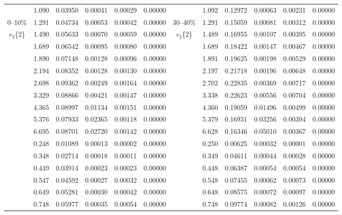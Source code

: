 \documentclass[aps,prc,superscriptaddress,showpacs,floatfix,twocolumn]{revtex4}
\begin{document}
\begin{table}[htbp]
\begin{ruledtabular}
\begin{tabular}{c|ccccc||c|ccccc}
 & 1.090 & 0.03950 & 0.00041 & 0.00029   &  0.00000 &  & 1.092 & 0.12972   & 0.00063 &  0.00231  & 0.00000 \\
0--10\% 
 & 1.291 & 0.04734 &  0.00053 & 0.00042  & 0.00000 &  30--40\%& 1.291 & 0.15059   & 0.00081 &  0.00312 & 0.00000 \\
$v_2$\{2\}  
& 1.490 &    0.05633   &  0.00070   & 0.00059 & 0.00000 &  $v_2$\{2\} & 1.489 & 0.16955   & 0.00107 &  0.00395 & 0.00000 \\
 & 1.689 &   0.06542   &  0.00095   & 0.00080  & 0.00000 &  	      & 1.689 & 0.18422   & 0.00147 &  0.00467 & 0.00000 \\
 & 1.890 &   0.07148   &  0.00128   & 0.00096  & 0.00000 &            & 1.891 & 0.19625   & 0.00198 &  0.00529 & 0.00000 \\
 & 2.194 &   0.08352   &  0.00128   & 0.00130  & 0.00000 &            & 2.197 & 0.21718   & 0.00196 &  0.00648 & 0.00000 \\
 & 2.698 &   0.09362   &  0.00249   & 0.00164  & 0.00000 &            & 2.702 & 0.22835   & 0.00369 &  0.00717 & 0.00000 \\
 & 3.329 &   0.08866   &  0.00421   & 0.00147  & 0.00000 &            & 3.338 & 0.22623   & 0.00556 &  0.00704 & 0.00000 \\
 & 4.365 &   0.08997   &  0.01134   & 0.00151  & 0.00000 &            & 4.360 & 0.19059   & 0.01496 &  0.00499 & 0.00000 \\
 & 5.376 &   0.07933   &  0.02365   & 0.00118  & 0.00000 &            & 5.379 & 0.16931   & 0.03256 &  0.00394 & 0.00000 \\
 & 6.695 &   0.08701   &  0.02720   & 0.00142  & 0.00000 &            & 6.628 & 0.16346   & 0.05010 &  0.00367 & 0.00000 \\
\hline 
 & 0.248 &  0.01089   & 0.00013  & 0.00002  & 0.00000 &  & 0.250 & 0.00625   &  0.00032 & 0.00001  & 0.00000 \\
 & 0.348 &  0.02714   & 0.00018  & 0.00011  & 0.00000 &  & 0.349 & 0.04611   &  0.00044 & 0.00028  & 0.00000 \\
 & 0.449 &  0.03914   & 0.00023  & 0.00023  & 0.00000 &  & 0.448 & 0.06387   &  0.00054 & 0.00054  & 0.00000 \\
 & 0.547 &  0.04592   & 0.00027  & 0.00032  & 0.00000 &  & 0.548 & 0.07455   &  0.00062 & 0.00073  & 0.00000 \\
 & 0.649 &  0.05281   & 0.00030  & 0.00042  & 0.00000 &  & 0.648 & 0.08575   &  0.00072 & 0.00097  & 0.00000 \\
 & 0.748 &  0.05977   & 0.00035  & 0.00054  & 0.00000 &  & 0.748 & 0.09774   &  0.00082 & 0.00126  & 0.00000 \\

\end{tabular}
\end{ruledtabular}
\end{table}
\end{document}
